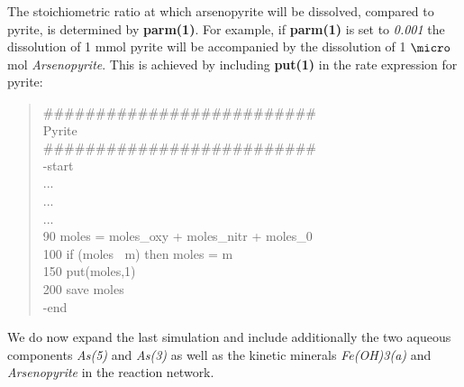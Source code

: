 The stoichiometric ratio at which arsenopyrite will be dissolved, compared to pyrite, is determined
by {\color{red} \textbf{parm(1)}}. For example, if {\color{red} \textbf{parm(1)}} is set to
\emph{0.001} the dissolution of 1 mmol pyrite will be accompanied by 
the dissolution of 1 $\micro$mol \emph{Arsenopyrite}.   
This is achieved by including {\color{red} \textbf{put(1)}}
in the rate expression for pyrite:

{\color{red}
\begin{quote}
\#\#\#\#\#\#\#\#\#\#\#\#\#\#\#\#\#\#\#\#\#\#\#\#\#\# \\
Pyrite \\
\#\#\#\#\#\#\#\#\#\#\#\#\#\#\#\#\#\#\#\#\#\#\#\#\#\# \\
-start \\
... \\
... \\
... \\
90 moles = moles\_oxy + moles\_nitr + moles\_0 \\
100 if (moles $\>$ m) then moles = m \\
150 put(moles,1) \\
200 save moles \\
-end \\
\end{quote}}

We do now expand the last simulation and include additionally the two aqueous components 
\emph{As(5)} and \emph{As(3)} as well as the kinetic minerals \emph{Fe(OH)3(a)} and \emph{Arsenopyrite} in the reaction network. 

